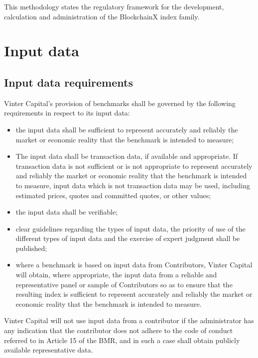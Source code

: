 \documentclass{article}
\begin{document}
This methodology states the regulatory framework for the development,
calculation and administration of the BlockchainX index family.

\section{Input data}\label{input-data}

\subsection{Input data requirements}\label{input-data-requirements}

Vinter Capital's provision of benchmarks shall be governed by the
following requirements in respect to its input data:

\begin{itemize}
\item
  the input data shall be sufficient to represent accurately and
  reliably the market or economic reality that the benchmark is intended
  to measure;
\item
  The input data shall be transaction data, if available and
  appropriate. If transaction data is not sufficient or is not
  appropriate to represent accurately and reliably the market or
  economic reality that the benchmark is intended to measure, input data
  which is not transaction data may be used, including estimated prices,
  quotes and committed quotes, or other values;
\item
  the input data shall be verifiable;
\item
  clear guidelines regarding the types of input data, the priority of
  use of the different types of input data and the exercise of expert
  judgment shall be published;
\item
  where a benchmark is based on input data from Contributors, Vinter
  Capital will obtain, where appropriate, the input data from a reliable
  and representative panel or sample of Contributors so as to ensure
  that the resulting index is sufficient to represent accurately and
  reliably the market or economic reality that the benchmark is intended
  to measure.
\end{itemize}

Vinter Capital will not use input data from a contributor if the
administrator has any indication that the contributor does not adhere to
the code of conduct referred to in Article 15 of the BMR, and in such a
case shall obtain publicly available representative data.
\end{document}
